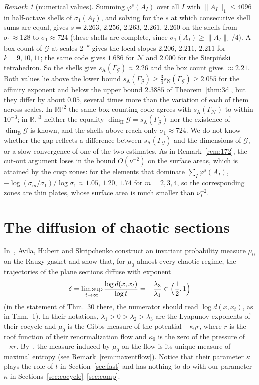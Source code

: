 \documentclass[11pt]{amsart}
\theoremstyle{definition}
\theoremstyle{remark}
\newtheorem{remark}[proposition]{Remark}
\newcommand{\RP}{\mathbb{RP}}
\newcommand{\cN}{\mathcal N}
\newcommand{\GN}{\Gamma_{\mathcal N}}
\newcommand{\cG}{\mathcal G}
\newcommand{\GG}{\Gamma_{\mathcal G}}
\newcommand{\sN}{s_{\mathrm N}}
\newcommand{\sA}{s_{\mathrm A}}
\newcommand{\dimH}{\dim_{\mathrm H}}
\newcommand{\dimB}{\dim_{\mathrm B}}
\begin{document}
\begin{remark}[numerical values]\label{rem:3dnum}
Summing $\varphi^s(A_I)$ over all $I$ with $\|A_I\|_1\le4096$ in half-octave shells of $\sigma_1(A_I)$, and solving for the $s$ at which consecutive shell sums are equal, gives $s=2.263$, $2.256$, $2.263$, $2.261$, $2.260$ on the shells from $\sigma_1\approx128$ to $\sigma_1\approx724$ (these shells are complete, since $\sigma_1(A_I)\ge\|A_I\|_1/4$). A box count of $\cG$ at scales $2^{-k}$ gives the local slopes $2.206$, $2.211$, $2.211$ for $k=9,10,11$; the same code gives $1.686$ for $\cN$ and $2.000$ for the Sierpi\'nski tetrahedron. So the shells give $\sA(\GG)\approx2.26$ and the box count gives $\approx2.21$. Both values lie above the lower bound $\sA(\GG)\ge\frac34\sN(\GG)\ge2.055$ for the affinity exponent and below the upper bound $2.3885$ of Theorem~\ref{thm:3d}, but they differ by about $0.05$, several times more than the variation of each of them across scales. In $\RP^2$ the same box-counting code agrees with $\sA(\GN)$ to within $10^{-3}$; in $\RP^3$ neither the equality $\dimH\cG=\sA(\GG)$ nor the existence of $\dimB\cG$ is known, and the shells above reach only $\sigma_1\approx724$. We do not know whether the gap reflects a difference between $\sA(\GG)$ and the dimensions of $\cG$, or a slow convergence of one of the two estimates. As in Remark~\ref{rem:172}, the cut-out argument loses in the bound $O(\nu^{-2})$ on the surface areas, which is attained by the cusp zones: for the elements that dominate $\sum_I\varphi^s(A_I)$, $-\log(\sigma_m/\sigma_1)/\log\sigma_1\approx1.05$, $1.20$, $1.74$ for $m=2,3,4$, so the corresponding zones are thin plates, whose surface area is much smaller than $\nu_I^{-2}$.
\end{remark}

\section{The diffusion of chaotic sections}\label{sec:AHS}

In~\cite{AHSinv}, Avila, Hubert and Skripchenko construct an invariant probability measure
$\mu_0$ on the Rauzy gasket and show that, for $\mu_0$-almost every chaotic regime, the
trajectories of the plane sections diffuse with exponent
\[
  \delta=\limsup_{t\to\infty}\frac{\log d(x,x_t)}{\log t}=-\frac{\lambda_3}{\lambda_1}
  \in\Bigl(\frac12,1\Bigr)
\]
\cite[Thm.~1 and Thm.~30]{AHSinv} (in the statement of Thm.~30 there, the numerator should read $\log d(x,x_t)$, as in Thm.~1).
In their notations, $\lambda_1>0>\lambda_2>\lambda_3$ are the Lyapunov exponents of their cocycle and $\mu_0$ is the Gibbs measure of the potential $-\kappa_0r$, where $r$ is the roof function of their renormalization flow and $\kappa_0$ is the zero of the pressure of $-\kappa r$.
By~\cite[Thm.~25]{AHSinv}, the measure induced by $\mu_0$ on the flow is its unique measure of maximal entropy (see Remark~\ref{rem:maxentflow}).
Notice that their parameter $\kappa$ plays the role of $t$ in Section~\ref{sec:fast} and has nothing to do with our parameter $\kappa$ in Sections~\ref{sec:cocycle}--\ref{sec:comp}.
\end{document}
